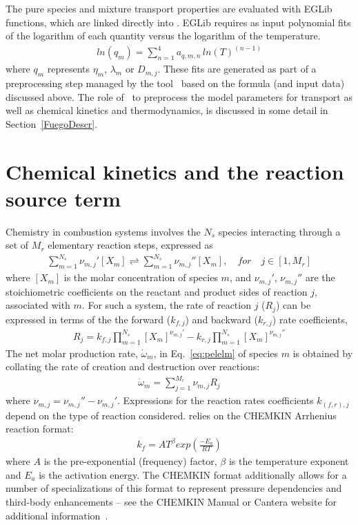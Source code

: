 The pure species and mixture transport properties are evaluated with EGLib functions, which are linked directly into \pelelm.  EGLib requires as input polynomial fits of the logarithm of each quantity versus the logarithm of the temperature.
\begin{eqnarray*}
ln(q_m) = \sum_{n=1}^4 a_{q,m,n} \, ln(T)^{(n-1)} 
\end{eqnarray*}
where $q_m$ represents $\eta_m$, $\lambda_m$ or $D_{m,j}$. These fits are generated as part of a preprocessing step managed by the tool \fuego\ based on the formula (and input data) discussed above. The role of \fuego\ to preprocess the model parameters for transport as well as chemical kinetics and thermodynamics, is discussed in some detail in Section~\ref{FuegoDescr}.

\section{Chemical kinetics and the reaction source term}
\label{ChemKinetics}
Chemistry in combustion systems involves the $N_s$ species interacting through a set of $M_r$ elementary reaction steps, expressed as
\begin{eqnarray*}
\sum_{m=1}^{N_s} \nu_{m,j}'[X_m] \rightleftharpoons \sum_{m=1}^{N_s} \nu_{m,j}''[X_m],\quad for \quad j \in [1,M_r] 
\label{IntroKM1}
\end{eqnarray*}
where $[X_m]$ is the molar concentration of species $m$, and $\nu_{m,j}'$, $\nu_{m,j}''$ are the stoichiometric coefficients on the reactant and product sides of reaction $j$, associated with $m$. For such a system, the rate of reaction $j$ ($R_j$) can be expressed in terms of the the forward ($k_{f,j}$) and backward ($k_{r,j}$) rate coefficients,
\begin{eqnarray*} 
R_{j} = k_{f,j}\prod_{m=1}^{N_s}  [X_{m}]^{\nu_{m,j}'}-k_{r,j}\prod_{m=1}^{N_s} [X_{m}]^{\nu_{m,j}''}
\end{eqnarray*}
The net molar production rate, $ \dot{\omega}_m$, in Eq.~\ref{eq:pelelm} of species $m$ is obtained by
collating the rate of creation and destruction over reactions:
\begin{eqnarray*}
\dot{\omega}_m = \sum_{j=1}^{M_r} \nu_{m,j} R_j 
\label{IntroKM3}
\end{eqnarray*}
where $\nu_{m,j} =\nu_{m,j}'' - \nu_{m,j}'$. Expressions for the reaction rates coefficients $k_{(f,r),j}$ depend on the type of reaction considered. \pelelm \; relies on the CHEMKIN Arrhenius reaction format:
\begin{eqnarray*}
k_f = AT^{\beta} exp \left( \frac{-E_a}{RT}\right)
\end{eqnarray*}
where $A$ is the pre-exponential (frequency) factor, $\beta$ is the temperature exponent and $E_a$ is the activation energy. The CHEMKIN format additionally allows for a number of specializations of this format to represent pressure dependencies and third-body enhancements -- see the CHEMKIN Manual or Cantera website for additional information~\cite{Kee:1989,cantera}.

